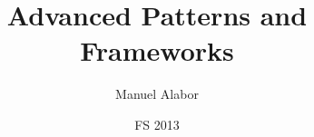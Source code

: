 \begin{titlepage}
\title{Advanced Patterns and Frameworks}
\author{Manuel Alabor}
\date{FS 2013}
\maketitle
\end{titlepage}